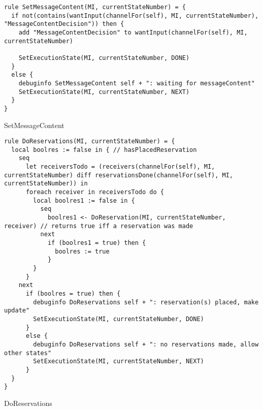 \begin{listing}[H]
\begin{verbatim}
rule SetMessageContent(MI, currentStateNumber) = {
  if not(contains(wantInput(channelFor(self), MI, currentStateNumber), "MessageContentDecision")) then {
    add "MessageContentDecision" to wantInput(channelFor(self), MI, currentStateNumber)

    SetExecutionState(MI, currentStateNumber, DONE)
  }
  else {
    debuginfo SetMessageContent self + ": waiting for messageContent"
    SetExecutionState(MI, currentStateNumber, NEXT)
  }
}
\end{verbatim}
\caption{SetMessageContent}
\label{lst:asm:SetMessageContent}
\end{listing}




\begin{listing}[H]
\begin{verbatim}
rule DoReservations(MI, currentStateNumber) = {
  local boolres := false in { // hasPlacedReservation
    seq
      let receiversTodo = (receivers(channelFor(self), MI, currentStateNumber) diff reservationsDone(channelFor(self), MI, currentStateNumber)) in
      foreach receiver in receiversTodo do {
        local boolres1 := false in {
          seq
            boolres1 <- DoReservation(MI, currentStateNumber, receiver) // returns true iff a reservation was made
          next
            if (boolres1 = true) then {
              boolres := true
            }
        }
      }
    next
      if (boolres = true) then {
        debuginfo DoReservations self + ": reservation(s) placed, make update"
        SetExecutionState(MI, currentStateNumber, DONE)
      }
      else {
        debuginfo DoReservations self + ": no reservations made, allow other states"
        SetExecutionState(MI, currentStateNumber, NEXT)
      }
  }
}
\end{verbatim}
\caption{DoReservations}
\label{lst:asm:DoReservations}
\end{listing}





